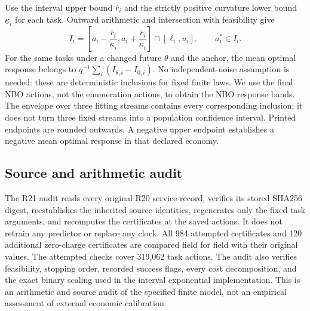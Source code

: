 Use the interval upper bound $\overline r_i$ and the strictly positive
curvature lower bound $\underline\kappa_i$ for each task. Outward arithmetic
and intersection with feasibility give
\[
 I_i=\left[a_i-\frac{\overline r_i}{\underline\kappa_i},
           a_i+\frac{\overline r_i}{\underline\kappa_i}\right]
                   \cap[\ell_i,u_i],\qquad a_i^*\in I_i.
\]
For the same tasks under a changed future $\theta$ and the anchor, the mean
optimal response belongs to $q^{-1}\sum_i(I_{\theta,i}-I_{0,i})$.
No independent-noise assumption is needed: these are deterministic
inclusions for fixed finite laws. We use the final NBO actions, not the
enumeration actions, to obtain the NBO response bands. The envelope over
three fitting streams contains every corresponding inclusion; it does not
turn three fixed streams into a population confidence interval. Printed
endpoints are rounded outwards. A negative upper endpoint establishes a
negative mean optimal response in that declared economy.

\subsection{Source and arithmetic audit}
The R21 audit reads every original R20 service record, verifies its stored
SHA256 digest, reestablishes the inherited source identities, regenerates
only the fixed task arguments, and recomputes the certificates at the saved
actions. It does not retrain any predictor or replace any clock. All
984 attempted certificates and 120 additional zero-charge certificates are
compared field for field with their original values. The attempted checks
cover 319,062 task actions. The audit also verifies feasibility, stopping
order, recorded success flags, every cost decomposition, and the exact
binary scaling used in the interval exponential implementation. This is an
arithmetic and source audit of the specified finite model, not an empirical
assessment of external economic calibration.
